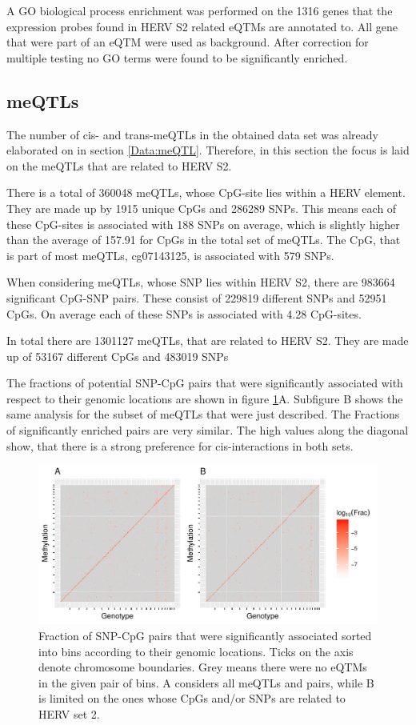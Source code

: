 \documentclass[a4paper,12pt,twoside,openright]{article}
\begin{document}
A GO biological process enrichment was performed on the 1316 genes that the expression probes found in HERV S2 related eQTMs are annotated to. All gene that were part of an eQTM were used as background. After correction for multiple testing no GO terms were found to be significantly enriched. 

\subsection{meQTLs}
\label{Results:meQTLs}
The number of cis- and trans-meQTLs in the obtained data set was already elaborated on in section \ref{Data:meQTL}. Therefore, in this section the focus is laid on the meQTLs that are related to HERV S2.

There is a total of 360048 meQTLs, whose CpG-site lies within a HERV element. They are made up by 1915 unique CpGs and 286289 SNPs. This means each of these CpG-sites is associated with 188 SNPs on average, which is slightly higher than the average of 157.91 for CpGs in the total set of meQTLs. The CpG, that is part of most meQTLs, cg07143125, is associated with 579 SNPs. 

When considering meQTLs, whose SNP lies within HERV S2, there are 983664 significant CpG-SNP pairs. These consist of 229819 different SNPs and 52951 CpGs. On average each of these SNPs is associated with 4.28 CpG-sites. 

In total there are 1301127 meQTLs, that are related to HERV S2. They are made up of 53167 different CpGs and 483019 SNPs

The fractions of potential SNP-CpG pairs that were significantly associated with respect to their genomic locations are shown in figure \ref{fig:global.meqtl.heatmap}A. Subfigure B shows the same analysis for the subset of meQTLs that were just described. The Fractions of significantly enriched pairs are very similar. The high values along the diagonal show, that there is a strong preference for cis-interactions in both sets. 

\begin{figure}[tb]
	\includegraphics[scale = 0.9, keepaspectratio = true]{../figures/meqtl_all_herv_heatmap}  
	\caption{Fraction of SNP-CpG pairs that were significantly associated sorted into bins according to their genomic locations. Ticks on the axis denote chromosome boundaries. Grey means there were no eQTMs in the given pair of bins. A considers all meQTLs and pairs, while B is limited on the ones whose CpGs and/or SNPs are related to HERV set 2.}
    \label{fig:global.meqtl.heatmap}
\end{figure}
\end{document}
